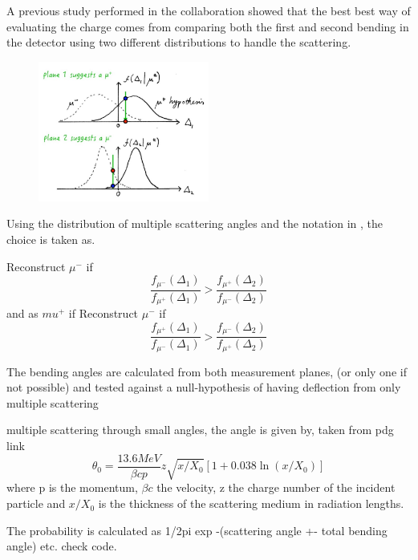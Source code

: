 A previous study performed in the collaboration showed that the best best way of evaluating the charge comes from comparing both the first and second bending in the detector using two different distributions to handle the scattering.

\begin{figure}[h!]
\centering
\includegraphics[width=0.5\textwidth]{figures/lowP/null.jpg}
\caption{}
\label{fig:NullHyp}
\end{figure}

Using the distribution of multiple scattering angles and the notation in , the choice is taken as. 

Reconstruct $\mu^-$ if 
\begin{equation}
\frac{f_{\mu^-}(\Delta_1)}{f_{\mu^+}(\Delta_1)} > \frac{f_{\mu^+}(\Delta_2)}{f_{\mu^-}(\Delta_2)}
\end{equation}
and as $mu^+$ if
Reconstruct $\mu^-$ if 
\begin{equation}
\frac{f_{\mu^+}(\Delta_1)}{f_{\mu^-}(\Delta_1)} > \frac{f_{\mu^-}(\Delta_2)}{f_{\mu^+}(\Delta_2)}
\end{equation}

The bending angles are calculated from both measurement planes, (or only one if not possible) and tested against a null-hypothesis of having deflection from only multiple scattering 


multiple scattering  through small angles, the angle is given by, taken from pdg link
\begin{equation}
\theta_0 = \frac{13.6 MeV}{\beta cp} z \sqrt{x/X_0}[1+0.038\ln(x/X_0)]
\end{equation}
where p is the momentum, $\beta c$ the velocity, z the charge number of the incident particle and $x/X_0$ is the thickness of the scattering medium in radiation lengths.

The probability is calculated as 1/2pi exp -(scattering angle +- total bending angle) etc. check code.





